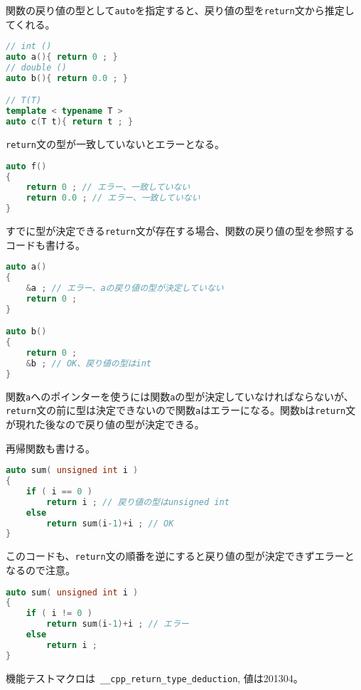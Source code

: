 %

関数の戻り値の型として\lstinline!auto!を指定すると、戻り値の型を\lstinline!return!文から推定してくれる。

\begin{lstlisting}[language=C++]
// int ()
auto a(){ return 0 ; }
// double ()
auto b(){ return 0.0 ; }

// T(T)
template < typename T >
auto c(T t){ return t ; }
\end{lstlisting}

\lstinline!return!文の型が一致していないとエラーとなる。

\begin{lstlisting}[language=C++]
auto f()
{
    return 0 ; // エラー、一致していない
    return 0.0 ; // エラー、一致していない
}
\end{lstlisting}

すでに型が決定できる\lstinline!return!文が存在する場合、関数の戻り値の型を参照するコードも書ける。

\begin{lstlisting}[language=C++]
auto a()
{
    &a ; // エラー、aの戻り値の型が決定していない
    return 0 ;
}

auto b()
{
    return 0 ;
    &b ; // OK、戻り値の型はint
}
\end{lstlisting}

関数\lstinline!a!へのポインターを使うには関数\lstinline!a!の型が決定していなければならないが、\lstinline!return!文の前に型は決定できないので関数\lstinline!a!はエラーになる。関数\lstinline!b!は\lstinline!return!文が現れた後なので戻り値の型が決定できる。

再帰関数も書ける。

\begin{lstlisting}[language=C++]
auto sum( unsigned int i )
{
    if ( i == 0 )
        return i ; // 戻り値の型はunsigned int
    else
        return sum(i-1)+i ; // OK
}
\end{lstlisting}

このコードも、\lstinline!return!文の順番を逆にすると戻り値の型が決定できずエラーとなるので注意。

\begin{lstlisting}[language=C++]
auto sum( unsigned int i )
{
    if ( i != 0 )
        return sum(i-1)+i ; // エラー
    else
        return i ;
}
\end{lstlisting}

機能テストマクロは~\lstinline!__cpp_return_type_deduction!, 値は201304。
